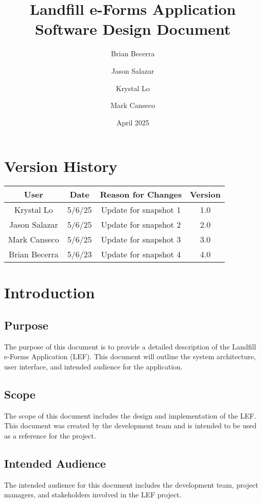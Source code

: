 \documentclass[12pt]{article}
\title{Landfill e-Forms Application\\
Software Design Document}
\author{
    Brian Becerra\\
    \and
    Jason Salazar\\
    \and
    Krystal Lo\\
    \and
    Mark Canseco\\
    }
\date{April 2025}
\begin{document}
\begin{titlepage}
\maketitle
\thispagestyle{empty}
\end{titlepage}

\thispagestyle{empty}
\tableofcontents
\newpage

\section*{Version History}
\begin{table}[ht]
    \centering
    \begin{tabular}{|c|c|c|c|}
    \hline
    \textbf{User} & \textbf{Date} & \textbf{Reason for Changes} & \textbf{Version}\\
    \hline
         Krystal Lo &  5/6/25 &  Update for snapshot 1 & 1.0 \\
    \hline
         Jason Salazar & 5/6/25 & Update for snapshot 2 & 2.0\\
    \hline
         Mark Canseco & 5/6/25 & Update for snapshot 3 & 3.0\\
    \hline
         Brian Becerra& 5/6/23  & Update for snapshot 4 & 4.0\\
    \hline
    \end{tabular}
\end{table}
\newpage

\section{Introduction}
\subsection{Purpose}
The purpose of this document is to provide a detailed description of the Landfill e-Forms Application (LEF). This document will outline the system architecture, user interface, and intended audience for the application.
\subsection{Scope}
The scope of this document includes the design and implementation of the LEF. This document was created by the development team and is intended to be used as a reference for the project.
\subsection{Intended Audience}
The intended audience for this document includes the development team, project managers, and stakeholders involved in the LEF project. 
\end{document}
